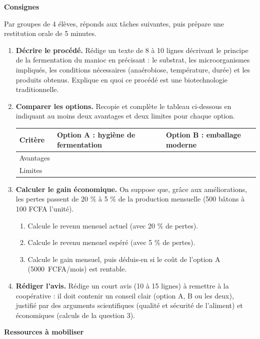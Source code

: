 \documentclass[11pt]{article}
\newcommand{\cle}[1]{{\popxbold\color{popdark}#1}}
\begin{document}
\textbf{Consignes}

Par groupes de 4 élèves, réponds aux tâches suivantes, puis prépare une restitution orale de 5 minutes.

\begin{enumerate}
\item \textbf{Décrire le procédé.} Rédige un texte de 8 à 10 lignes décrivant le principe de la fermentation du manioc en précisant : le \cle{substrat}, les \cle{microorganismes} impliqués, les \cle{conditions} nécessaires (anaérobiose, température, durée) et les \cle{produits} obtenus. Explique en quoi ce procédé est une \cle{biotechnologie traditionnelle}.
\item \textbf{Comparer les options.} Recopie et complète le tableau ci-dessous en indiquant au moins deux avantages et deux limites pour chaque option.
\begin{center}
\begin{tabularx}{\linewidth}{|l|X|X|}
\hline
\rowcolor{popblueL} \textbf{Critère} & \textbf{Option A : hygiène de fermentation} & \textbf{Option B : emballage moderne} \\
\hline
Avantages & & \\
\hline
Limites & & \\
\hline
\end{tabularx}
\end{center}
\item \textbf{Calculer le gain économique.} On suppose que, grâce aux améliorations, les pertes passent de 20 \% à 5 \% de la production mensuelle (500 bâtons à 100 FCFA l'unité).
\begin{enumerate}
\item Calcule le revenu mensuel actuel (avec 20 \% de pertes).
\item Calcule le revenu mensuel espéré (avec 5 \% de pertes).
\item Calcule le gain mensuel, puis déduis-en si le coût de l'option A (\SI{5 000}{FCFA/mois}) est rentable.
\end{enumerate}
\item \textbf{Rédiger l'avis.} Rédige un court avis (10 à 15 lignes) à remettre à la coopérative : il doit contenir un conseil clair (option A, B ou les deux), justifié par des arguments scientifiques (qualité et sécurité de l'aliment) et économiques (calculs de la question 3).
\end{enumerate}

\textbf{Ressources à mobiliser}
\end{document}
